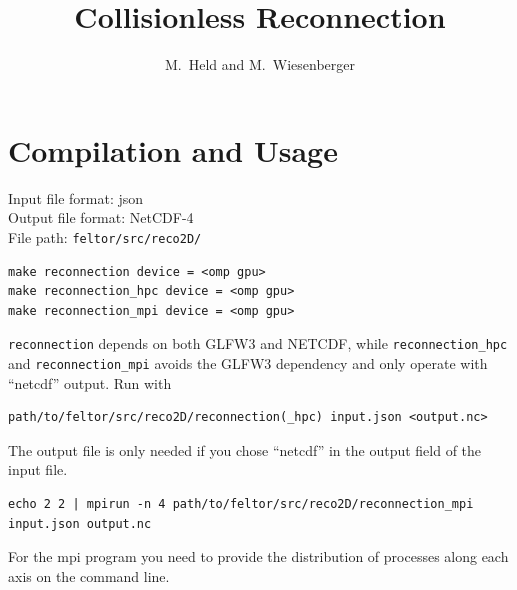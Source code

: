 


\usepackage{minted}

\renewcommand{\ne}{\ensuremath{n }}
\newcommand{\Ni}{\ensuremath{N}}
\newcommand{\ue}{\ensuremath{u_\parallel}}
\newcommand{\Ui}{\ensuremath{U_\parallel}}
\newcommand{\Apar}{\ensuremath{A_\parallel}}
\newcommand{\bperp}{\ensuremath{ \vec b_\perp}}
\newcommand{\neref}{\ensuremath{n_0}}
\newcommand{\Teref}{\ensuremath{T_{e0}}} %



\title{Collisionless Reconnection}
\author{ M.~Held and M.~Wiesenberger}
\maketitle

\begin{abstract}
\end{abstract}
\tableofcontents

\section{Compilation and Usage}
Input file format: json\\
Output file format: NetCDF-4\\
File path: \texttt{feltor/src/reco2D/}
\begin{verbatim}
make reconnection device = <omp gpu>
make reconnection_hpc device = <omp gpu>
make reconnection_mpi device = <omp gpu>
\end{verbatim}
\texttt{reconnection} depends on both GLFW3 and NETCDF, while
\texttt{reconnection\_hpc} and \texttt{reconnection\_mpi} avoids the GLFW3 dependency and only operate with ``netcdf'' output.
Run with
\begin{verbatim}
path/to/feltor/src/reco2D/reconnection(_hpc) input.json <output.nc>
\end{verbatim}
The output file is only needed if you chose ``netcdf'' in the output field
of the input file.
\begin{verbatim}
echo 2 2 | mpirun -n 4 path/to/feltor/src/reco2D/reconnection_mpi input.json output.nc
\end{verbatim}
For the mpi program you need to provide the distribution of processes along each
axis on the command line.

